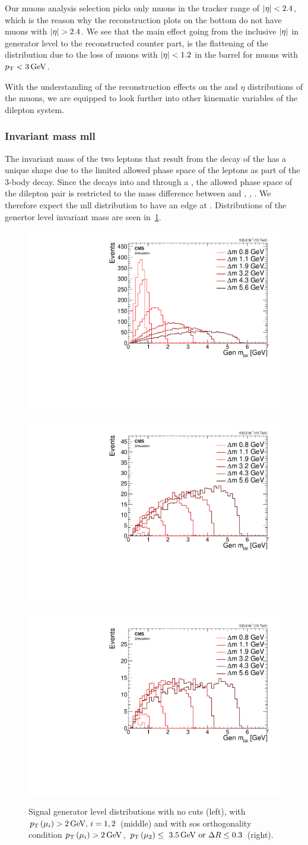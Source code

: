 Our muons analysis selection picks only muons in the tracker range of $\lvert \eta \rvert<2.4$, which is the reason why the reconstruction plots on the bottom do not have muons with $\lvert \eta \rvert>2.4$. We see that the main effect going from the inclusive $\lvert \eta \rvert$ in generator level to the reconstructed counter part, is the flattening of the distribution due to the loss of muons with $\lvert \eta \rvert<1.2$ in the barrel for muons with $p_{\mathrm{T}}<3\,\text{Ge\hspace{-.08em}V}$.

With the understanding of the reconstruction effects on the \pt and $\eta$ distributions of the muons, we are equipped to look further into other kinematic variables of the dilepton system.

\subsubsection{Invariant mass \gls{mll}}
\label{sec:gen-invariant-mass}

The invariant mass of the two leptons that result from the decay of the \neutt has a unique shape due to the limited allowed phase space of the leptons as part of the 3-body decay. Since the \neutt decays into \neuto and \ellell through a \PZstar, the allowed phase space of the dilepton pair is restricted to the mass difference between \neutt and \neuto, \ie, \dm. We therefore expect the \gls{mll} distribution to have an edge at \dm. Distributions of the genertor level invariant mass are seen in~\ref{fig:signal-generator-mll}.

\begin{figure}[!htb]
\centering
\includegraphics[width=0.32\linewidth]{plots/signal_muons_gen/none_gen_invMass.pdf} \,
\includegraphics[width=0.32\linewidth]{plots/signal_muons_gen/none_gen_invMass_cut.pdf}  \,
\includegraphics[width=0.32\linewidth]{plots/signal_muons_gen/none_gen_invMass_orth.pdf} \\
\caption[Signal generator level \mll distributions]{ Signal generator level \mll distributions with no cuts (left), with $p_{\mathrm{T}}\left(\mu_i\right)>2\,\text{Ge\hspace{-.08em}V},\,i=1,2$ (middle) and with \gls{sos} orthogonality condition $p_{\mathrm{T}}\left(\mu_i\right)>2\,\text{Ge\hspace{-.08em}V}$, $p_{\mathrm{T}}\left(\mu_2\right)\leq~3.5\,\text{Ge\hspace{-.08em}V}\text{ or }\Delta R\leq 0.3$ (right).}
\label{fig:signal-generator-mll}
\end{figure}

